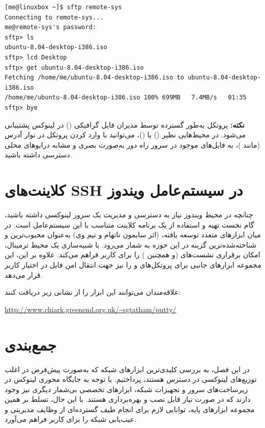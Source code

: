\begin{latin}
\begin{lstlisting}
[me@linuxbox ~]$ sftp remote-sys
Connecting to remote-sys...
me@remote-sys's password:
sftp> ls
ubuntu-8.04-desktop-i386.iso
sftp> lcd Desktop
sftp> get ubuntu-8.04-desktop-i386.iso
Fetching /home/me/ubuntu-8.04-desktop-i386.iso to ubuntu-8.04-desktop-i386.iso
/home/me/ubuntu-8.04-desktop-i386.iso 100% 699MB   7.4MB/s   01:35
sftp> bye
\end{lstlisting}
\end{latin}

\begin{note}
\textbf{نکته:} پروتکل  به‌طور گسترده توسط مدیران فایل گرافیکی () در لینوکس پشتیبانی می‌شود. در محیط‌هایی نظیر  () یا  ()، می‌توانید با وارد کردن پروتکل  در نوار آدرس (مانند )، به فایل‌های موجود در سرور راه دور به‌صورت بصری و مشابه درایوهای محلی دسترسی داشته باشید.
\end{note}

\section{کلاینت‌های SSH در سیستم‌عامل ویندوز}

چنانچه در محیط ویندوز نیاز به دسترسی و مدیریت یک سرور لینوکسی داشته باشید، گام نخست تهیه و استفاده از یک برنامه کلاینت  متناسب با این سیستم‌عامل است. در میان ابزارهای متعدد توسعه یافته،  (اثر سایمون تاتهام و تیم وی) به‌عنوان محبوب‌ترین و شناخته‌شده‌ترین گزینه در این حوزه به شمار می‌رود.  با شبیه‌سازی یک محیط ترمینال، امکان برقراری نشست‌های  (و همچنین ) را برای کاربر فراهم می‌کند. علاوه بر این، این مجموعه ابزارهای جانبی برای پروتکل‌های  و  را نیز جهت انتقال امن فایل در اختیار کاربر قرار می‌دهد.

علاقه‌مندان می‌توانند این ابزار را از نشانی زیر دریافت کنند:

\begin{latin}
\url{http://www.chiark.greenend.org.uk/~sgtatham/putty/}
\end{latin}

\section{جمع‌بندی}

در این فصل، به بررسی کلیدی‌ترین ابزارهای شبکه که به‌صورت پیش‌فرض در اغلب توزیع‌های لینوکسی در دسترس هستند، پرداختیم. با توجه به جایگاه محوری لینوکس در زیرساخت‌های سرور و تجهیزات شبکه، ابزارهای تخصصی بی‌شمار دیگری نیز وجود دارند که در صورت نیاز قابل نصب و بهره‌برداری هستند. با این حال، تسلط بر همین مجموعه ابزارهای پایه، توانایی لازم برای انجام طیف گسترده‌ای از وظایف مدیریتی و عیب‌یابی شبکه را برای کاربر فراهم می‌آورد.

